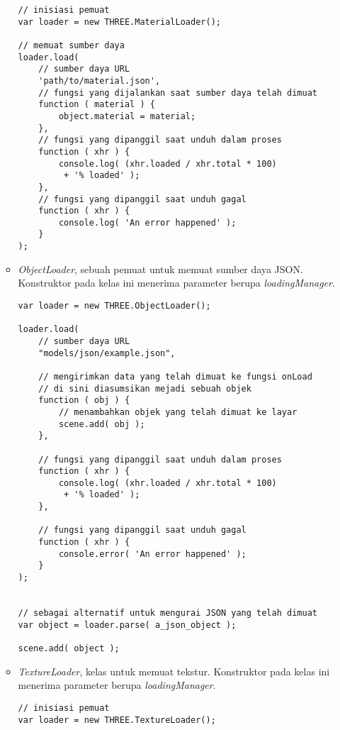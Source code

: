 \begin{itemize}
\begin{itemize}
\begin{lstlisting}[caption={Contoh penggunaan kelas {\it MaterialLoader}.},captionpos=b]
// inisiasi pemuat
var loader = new THREE.MaterialLoader();

// memuat sumber daya
loader.load(
	// sumber daya URL
	'path/to/material.json',
	// fungsi yang dijalankan saat sumber daya telah dimuat
	function ( material ) {
		object.material = material;
	},
	// fungsi yang dipanggil saat unduh dalam proses
	function ( xhr ) {
		console.log( (xhr.loaded / xhr.total * 100)
		 + '% loaded' );
	},
	// fungsi yang dipanggil saat unduh gagal
	function ( xhr ) {
		console.log( 'An error happened' );
	}
);
\end{lstlisting}

	\item {\it ObjectLoader}, sebuah pemuat untuk memuat sumber daya JSON. Konstruktor pada kelas ini menerima parameter berupa  {\it loadingManager}.
	
\begin{lstlisting}[caption={Contoh penggunaan kelas {\it ObjectLoader}.},captionpos=b]
var loader = new THREE.ObjectLoader();

loader.load(
    // sumber daya URL
    "models/json/example.json",

    // mengirimkan data yang telah dimuat ke fungsi onLoad
    // di sini diasumsikan mejadi sebuah objek
    function ( obj ) {
		// menambahkan objek yang telah dimuat ke layar
        scene.add( obj );
    },

    // fungsi yang dipanggil saat unduh dalam proses
    function ( xhr ) {
        console.log( (xhr.loaded / xhr.total * 100)
         + '% loaded' );
    },

    // fungsi yang dipanggil saat unduh gagal
    function ( xhr ) {
        console.error( 'An error happened' );
    }
);


// sebagai alternatif untuk mengurai JSON yang telah dimuat
var object = loader.parse( a_json_object );

scene.add( object );
\end{lstlisting}

	\item {\it TextureLoader}, kelas untuk memuat tekstur. Konstruktor pada kelas ini menerima parameter berupa  {\it loadingManager}.
	
\begin{lstlisting}[caption={Contoh penggunaan kelas {\it TextureLoader}.},captionpos=b]
// inisiasi pemuat
var loader = new THREE.TextureLoader();


\end{lstlisting}
\end{itemize}
\end{itemize}
